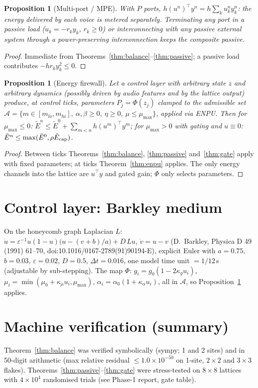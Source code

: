 \documentclass[11pt]{article}
\newtheorem{proposition}[theorem]{Proposition}
\theoremstyle{remark}\newtheorem{remark}{Remark}
\begin{document}
\begin{proposition}[Multi-port / MPE]\label{prop:mpe}
With $P$ ports, $h(u^n)^\top y^n=h\sum_ku_k^ny_k^n$: the energy delivered by each voice is metered separately. Terminating any port in a passive load
($u_k=-r_ky_k$, $r_k\ge0$) or interconnecting with any passive external system through a power-preserving interconnection keeps the composite passive.
\end{proposition}
\begin{proof}Immediate from Theorems~\ref{thm:balance}--\ref{thm:passive}; a passive load contributes $-hr_ky_k^2\le0$.\end{proof}

\begin{proposition}[Energy firewall]\label{prop:firewall}
Let a control layer with arbitrary state $z$ and arbitrary dynamics (possibly driven by audio features and by the lattice output) produce, at control ticks,
parameters $P_j=\Phi(z_j)$ clamped to the admissible set $\mathcal A=\{m\in[m_{lo},m_{hi}],\ \alpha,\beta\ge0,\ \eta\ge0,\ \mu\le\mu_{\max}\}$, applied via ENPU.
Then for $\mu_{\max}\le0$: $\tilde E^n\le\tilde E^0+\sum_{m<n}h(u^m)^\top y^m$; for $\mu_{\max}>0$ with gating and $u\equiv0$: $\tilde E^n\le\max(\tilde E^0,\rho\tilde E_{\rm cap})$.
\end{proposition}
\begin{proof}Between ticks Theorems~\ref{thm:balance}, \ref{thm:passive} and~\ref{thm:gate} apply with fixed parameters; at ticks Theorem~\ref{thm:enpu} applies. The only energy channels into the lattice are $u^\top y$ and gated gain; $\Phi$ only selects parameters.\end{proof}

\section{Control layer: Barkley medium}
On the honeycomb graph Laplacian $L$: $\dot u=\varepsilon^{-1}u(1-u)\big(u-(v+b)/a\big)+D\,Lu$, $\dot v=u-v$ (D.~Barkley, Physica D 49 (1991) 61--70,
doi:10.1016/0167-2789(91)90194-E), explicit Euler with $a=0.75$, $b=0.03$, $\varepsilon=0.02$, $D=0.5$, $\Delta t=0.016$, one model time unit $=1/12$\,s (adjustable by sub-stepping).
The map $\Phi$: $g_i=g_0(1-2\kappa_gu_i)$, $\mu_i=\min(\mu_0+\kappa_\mu u_i,\mu_{\max})$, $\alpha_i=\alpha_0(1+\kappa_\alpha u_i)$, all in $\mathcal A$, so Proposition~\ref{prop:firewall} applies.

\section{Machine verification (summary)}
Theorem~\ref{thm:balance} was verified symbolically (sympy; 1 and 2 sites) and in 50-digit arithmetic (max relative residual $\le1.0\times10^{-50}$ on 1-site, $2\times2$ and $3\times3$ flakes).
Theorems~\ref{thm:passive}--\ref{thm:gate} were stress-tested on $8\times8$ lattices with $4\times10^4$ randomised trials (see Phase-1 report, gate table).
\end{document}
